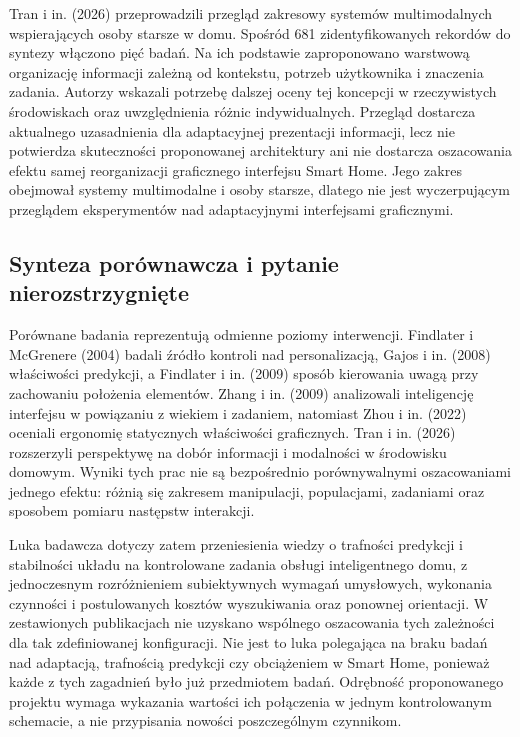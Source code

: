 \documentclass[11pt,a4paper]{article}
\begin{document}
Tran i in. (2026) przeprowadzili przegląd zakresowy systemów multimodalnych wspierających osoby starsze w domu. Spośród 681 zidentyfikowanych rekordów do syntezy włączono pięć badań. Na ich podstawie zaproponowano warstwową organizację informacji zależną od kontekstu, potrzeb użytkownika i znaczenia zadania. Autorzy wskazali potrzebę dalszej oceny tej koncepcji w rzeczywistych środowiskach oraz uwzględnienia różnic indywidualnych. Przegląd dostarcza aktualnego uzasadnienia dla adaptacyjnej prezentacji informacji, lecz nie potwierdza skuteczności proponowanej architektury ani nie dostarcza oszacowania efektu samej reorganizacji graficznego interfejsu Smart Home. Jego zakres obejmował systemy multimodalne i osoby starsze, dlatego nie jest wyczerpującym przeglądem eksperymentów nad adaptacyjnymi interfejsami graficznymi.

\subsection{Synteza porównawcza i pytanie nierozstrzygnięte}

Porównane badania reprezentują odmienne poziomy interwencji. Findlater i McGrenere (2004) badali źródło kontroli nad personalizacją, Gajos i in. (2008) właściwości predykcji, a Findlater i in. (2009) sposób kierowania uwagą przy zachowaniu położenia elementów. Zhang i in. (2009) analizowali inteligencję interfejsu w powiązaniu z wiekiem i zadaniem, natomiast Zhou i in. (2022) oceniali ergonomię statycznych właściwości graficznych. Tran i in. (2026) rozszerzyli perspektywę na dobór informacji i modalności w środowisku domowym. Wyniki tych prac nie są bezpośrednio porównywalnymi oszacowaniami jednego efektu: różnią się zakresem manipulacji, populacjami, zadaniami oraz sposobem pomiaru następstw interakcji.

Luka badawcza dotyczy zatem przeniesienia wiedzy o trafności predykcji i stabilności układu na kontrolowane zadania obsługi inteligentnego domu, z jednoczesnym rozróżnieniem subiektywnych wymagań umysłowych, wykonania czynności i postulowanych kosztów wyszukiwania oraz ponownej orientacji. W zestawionych publikacjach nie uzyskano wspólnego oszacowania tych zależności dla tak zdefiniowanej konfiguracji. Nie jest to luka polegająca na braku badań nad adaptacją, trafnością predykcji czy obciążeniem w Smart Home, ponieważ każde z tych zagadnień było już przedmiotem badań. Odrębność proponowanego projektu wymaga wykazania wartości ich połączenia w jednym kontrolowanym schemacie, a nie przypisania nowości poszczególnym czynnikom.
\end{document}
